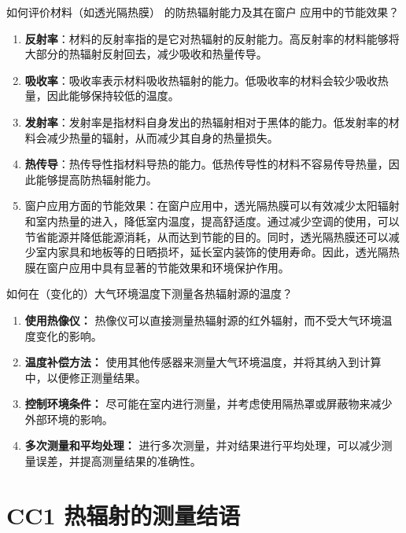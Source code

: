 \documentclass[dvipsnames, svgnames,a4paper,11pt]{article}
\begin{document}
	\begin{question}
		如何评价材料（如透光隔热膜） 的防热辐射能力及其在窗户
应用中的节能效果？
		\end{question}
\begin{enumerate}
  \item \textbf{反射率}：材料的反射率指的是它对热辐射的反射能力。高反射率的材料能够将大部分的热辐射反射回去，减少吸收和热量传导。

  \item \textbf{吸收率}：吸收率表示材料吸收热辐射的能力。低吸收率的材料会较少吸收热量，因此能够保持较低的温度。

  \item \textbf{发射率}：发射率是指材料自身发出的热辐射相对于黑体的能力。低发射率的材料会减少热量的辐射，从而减少其自身的热量损失。

  \item \textbf{热传导}：热传导性指材料导热的能力。低热传导性的材料不容易传导热量，因此能够提高防热辐射能力。
  \item 窗户应用方面的节能效果：在窗户应用中，透光隔热膜可以有效减少太阳辐射和室内热量的进入，降低室内温度，提高舒适度。通过减少空调的使用，可以节省能源并降低能源消耗，从而达到节能的目的。同时，透光隔热膜还可以减少室内家具和地板等的日晒损坏，延长室内装饰的使用寿命。因此，透光隔热膜在窗户应用中具有显著的节能效果和环境保护作用。


\end{enumerate}
\begin{question}
	如何在（变化的）大气环境温度下测量各热辐射源的温度？
	\end{question}
	\begin{enumerate}
		\item \textbf{使用热像仪：} 热像仪可以直接测量热辐射源的红外辐射，而不受大气环境温度变化的影响。
	  
		\item \textbf{温度补偿方法：} 使用其他传感器来测量大气环境温度，并将其纳入到计算中，以便修正测量结果。
	  
		\item \textbf{控制环境条件：} 尽可能在室内进行测量，并考虑使用隔热罩或屏蔽物来减少外部环境的影响。
	  
		\item \textbf{多次测量和平均处理：} 进行多次测量，并对结果进行平均处理，可以减少测量误差，并提高测量结果的准确性。
	  \end{enumerate}
	
	\clearpage
	
	\section{CC1 热辐射的测量\quad\heiti 结语}
	
\end{document}
